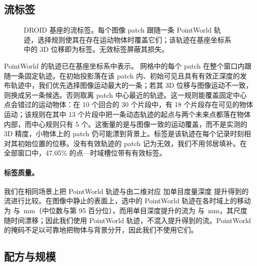 \subsection{流标签}
\label{app:lifting}
\begin{figure}[t]
\centering
{}
\caption{DROID 基座的流标签。每个图像 patch 跟随一条 PointWorld 轨迹，选择规则使其在存在运动物体时覆盖它们；该轨迹在基座坐标系中的 3D 位移即为标签。无效标签屏蔽其损失。}
\label{fig:lifting}
\end{figure}

PointWorld 的轨迹已在基座坐标系中表示。\cfgContextGrid{} 网格中的每个 patch 在整个窗口内跟随一条固定轨迹。在初始投影落在该 patch 内、初始可见且具有有效正深度的发布轨迹中，我们优先选择图像运动最大的一条；若其 3D 位移与图像运动不一致，则换成另一条候选。否则取离 patch 中心最近的轨迹。这一规则能覆盖固定中心点会错过的运动物体：在 10 个回合的 30 个片段中，有 18 个片段存在可见的物体运动；该规则在其中 13 个片段中把一条动态轨迹的起点与两个未来点都落在物体内部，而中心规则只有 5 个。这衡量的是与图像一致的运动覆盖，而不是实测的 3D 精度，小物体上的 patch 仍可能漂到背景上。标签是该轨迹在每个记录时刻相对其初始位置的位移。没有有效轨迹的 patch 记为无效，我们不用邻居填补。在全部窗口中，47.05\% 的点—时域槽位带有有效标签。

\paragraph{标签质量。}我们在相同场景上把 PointWorld 轨迹与由二维对应 \cite{dpflow} 加单目度量深度 \cite{moge2} 提升得到的流进行比较。在图像中静止的表面上，选中的 PointWorld 轨迹在各时域上的移动为  与 \,mm（中位数与第 95 百分位），而用单目深度提升的流为  与 \,mm，其尺度随时间漂移；因此我们使用 PointWorld 轨迹，不混入提升得到的流。PointWorld 的掩码不足以可靠地把物体与背景分开，因此我们不使用它们。

\subsection{配方与规模}
\label{app:scale}
